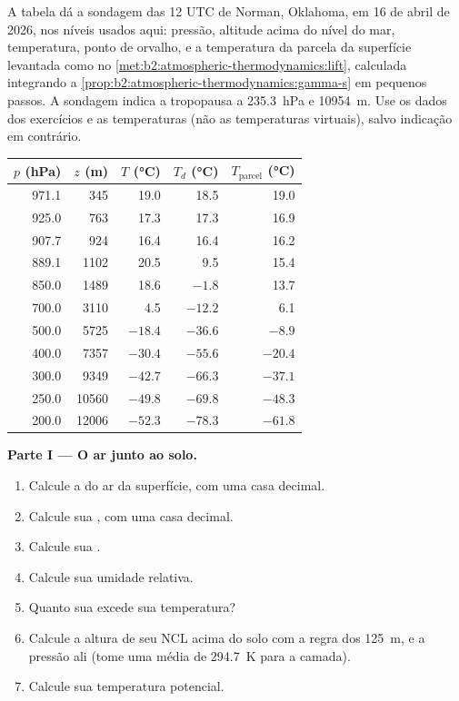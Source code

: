 \begin{problem}\label{pb:b2:atmospheric-thermodynamics:1}
A tabela dá a sondagem das 12 UTC de Norman, Oklahoma, em 16 de abril de 2026, nos níveis usados
aqui: pressão, altitude acima do nível do mar, temperatura, ponto de orvalho, e a temperatura da
parcela da superfície levantada como no \cref{met:b2:atmospheric-thermodynamics:lift}, calculada
integrando a \cref{prop:b2:atmospheric-thermodynamics:gamma-s} em pequenos passos. A sondagem
indica a tropopausa a \qty{235.3}{hPa} e \qty{10954}{m}. Use os dados dos exercícios e
as temperaturas (não as temperaturas virtuais), salvo indicação em contrário.

\begin{center}
\small
\begin{tabular}{rrrrr}
\hline
$p$ (\unit{hPa}) & $z$ (\unit{m}) & $T$ (\unit{\celsius}) & $T_d$ (\unit{\celsius}) &
$T_{\text{parcel}}$ (\unit{\celsius}) \\
\hline
971.1 & 345 & 19.0 & 18.5 & 19.0 \\
925.0 & 763 & 17.3 & 17.3 & 16.9 \\
907.7 & 924 & 16.4 & 16.4 & 16.2 \\
889.1 & 1102 & 20.5 & 9.5 & 15.4 \\
850.0 & 1489 & 18.6 & $-1.8$ & 13.7 \\
700.0 & 3110 & 4.5 & $-12.2$ & 6.1 \\
500.0 & 5725 & $-18.4$ & $-36.6$ & $-8.9$ \\
400.0 & 7357 & $-30.4$ & $-55.6$ & $-20.4$ \\
300.0 & 9349 & $-42.7$ & $-66.3$ & $-37.1$ \\
250.0 & 10560 & $-49.8$ & $-69.8$ & $-48.3$ \\
200.0 & 12006 & $-52.3$ & $-78.3$ & $-61.8$ \\
\hline
\end{tabular}
\end{center}

\medskip\noindent\textbf{Parte I --- O ar junto ao solo.}
\begin{enumerate}
  \item Calcule a  do ar da superfície, com uma casa decimal.
  \item Calcule sua , com uma casa decimal.
  \item Calcule sua .
  \item Calcule sua umidade relativa.
  \item Quanto sua  excede sua temperatura?
  \item Calcule a altura de seu NCL acima do solo com a regra dos \qty{125}{m}, e a pressão
        ali (tome uma  média de \qty{294.7}{K} para a camada).
  \item Calcule sua temperatura potencial.
\end{enumerate}


\end{problem}
